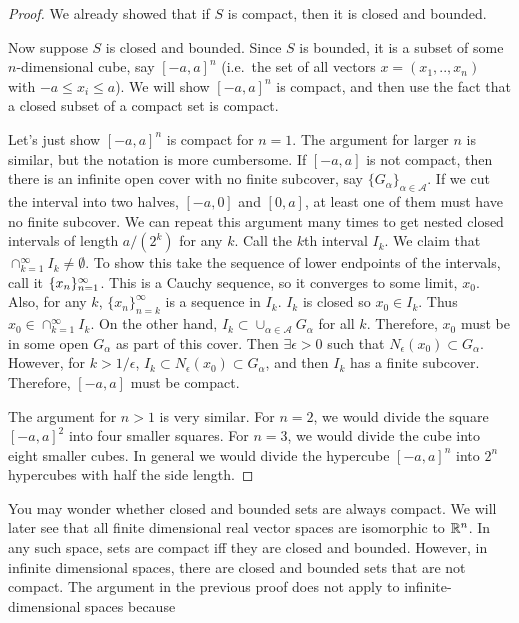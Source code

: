 \begin{proof}
  We already showed that if $S$ is compact, then it is closed and
  bounded. 

  Now suppose $S$ is closed and bounded. Since $S$ is bounded, it is a
  subset of some $n$-dimensional cube, say $[-a,a]^n$ (i.e.\ the set
  of all vectors $x = (x_1,..,x_n)$ with $-a \leq x_i \leq a$).  We
  will show $[-a,a]^n$ is compact, and then use the fact that a
  closed subset of a compact set is compact.

  Let's just show $[-a,a]^n$ is compact for $n=1$. The argument for
  larger $n$ is similar, but the notation is more cumbersome. If
  $[-a,a]$ is not compact, then there is an infinite open cover with
  no finite subcover, say $\{G_\alpha\}_{\alpha \in \mathcal{A}}$. If
  we cut the interval into two halves, $[-a,0]$ and $[0,a]$, at least
  one of them must have no finite subcover. We can repeat this
  argument many times to get nested closed intervals of length
  $a/(2^k)$ for any $k$. Call the $k$th interval $I_k$. We claim that
  $\cap_{k=1}^\infty I_k \neq \emptyset$. To show this take the
  sequence of lower endpoints of the intervals, call it
  $\{{x}_n \}_{n=1}^\infty$. This is a Cauchy sequence, so it converges to some limit,
  $x_0$. Also, for any $k$, $\{x_n\}_{n=k}^\infty$ is a sequence in
  $I_k$. $I_k$ is closed so $x_0 \in I_k$. Thus $x_0 \in
  \cap_{k=1}^\infty I_k$. On the other hand, $I_k \subset \cup_{\alpha
    \in \mathcal{A}} G_\alpha$ for all $k$. Therefore, $x_0$ must be
  in some open $G_\alpha$ as part of this cover. Then $\exists
  \epsilon>0$ such that $N_\epsilon(x_0) \subset G_\alpha$. However,
  for $k>1/\epsilon$, $I_k \subset N_\epsilon(x_0) \subset G_\alpha$,
  and then $I_k$ has a finite subcover. Therefore, $[-a,a]$ must be
  compact. 

  The argument for $n>1$ is very similar. For $n=2$, we would divide
  the square $[-a,a]^2$ into four smaller squares. For $n=3$, we would
  divide the cube into eight smaller cubes. In general we would divide
  the hypercube $[-a,a]^n$ into $2^n$ hypercubes with half the side
  length.
\end{proof}
You may wonder whether closed and bounded sets are always compact. We
will later see that all finite dimensional real vector spaces are
isomorphic to $\mathbb{R}^n$. In any such space, sets are compact iff they are
closed and bounded. However, in infinite dimensional spaces, there are
closed and bounded sets that are not compact. The argument in the
previous proof does not apply to infinite-dimensional spaces because
